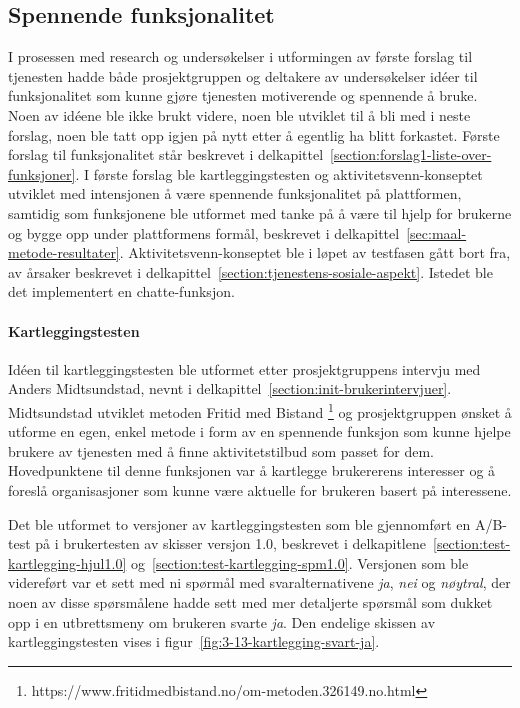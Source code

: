 \subsection{Spennende funksjonalitet}
I prosessen med research og undersøkelser i utformingen av første forslag til tjenesten hadde både prosjektgruppen og deltakere av undersøkelser idéer til funksjonalitet som kunne gjøre tjenesten motiverende og spennende å bruke. Noen av idéene ble ikke brukt videre, noen ble utviklet til å bli med i neste forslag, noen ble tatt opp igjen på nytt etter å egentlig ha blitt forkastet. Første forslag til funksjonalitet står beskrevet i delkapittel~\ref{section:forslag1-liste-over-funksjoner}. I første forslag ble kartleggingstesten og aktivitetsvenn-konseptet utviklet med intensjonen å være spennende funksjonalitet på plattformen, samtidig som funksjonene ble utformet med tanke på å være til hjelp for brukerne og bygge opp under plattformens formål, beskrevet i delkapittel~\ref{sec:maal-metode-resultater}. Aktivitetsvenn-konseptet ble i løpet av testfasen gått bort fra, av årsaker beskrevet i delkapittel~\ref{section:tjenestens-sosiale-aspekt}. Istedet ble det implementert en chatte-funksjon.

\paragraph{Kartleggingstesten}
Idéen til kartleggingstesten ble utformet etter prosjektgruppens intervju med Anders Midtsundstad, nevnt i delkapittel~\ref{section:init-brukerintervjuer}. Midtsundstad utviklet metoden Fritid med Bistand \footnote{https://www.fritidmedbistand.no/om-metoden.326149.no.html} og prosjektgruppen ønsket å utforme en egen, enkel metode i form av en spennende funksjon som kunne hjelpe brukere av tjenesten med å finne aktivitetstilbud som passet for dem. Hovedpunktene til denne funksjonen var å kartlegge brukererens interesser og å foreslå organisasjoner som kunne være aktuelle for brukeren basert på interessene. 

Det ble utformet to versjoner av kartleggingstesten som ble gjennomført en A/B-test på i brukertesten av skisser versjon 1.0, beskrevet i delkapitlene~\ref{section:test-kartlegging-hjul1.0} og~\ref{section:test-kartlegging-spm1.0}. Versjonen som ble videreført var et sett med ni spørmål med svaralternativene {\em ja}, {\em nei} og {\em nøytral}, der noen av disse spørsmålene hadde sett med mer detaljerte spørsmål som dukket opp i en utbrettsmeny om brukeren svarte {\em ja}. Den endelige skissen av kartleggingstesten vises i figur~\ref{fig:3-13-kartlegging-svart-ja}. 

